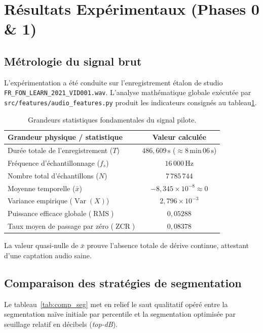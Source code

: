 \documentclass[10pt,a4paper,twocolumn]{article}
\begin{document}
\section{Résultats Expérimentaux (Phases 0 \& 1)}

\subsection{Métrologie du signal brut}
L'expérimentation a été conduite sur l'enregistrement étalon de studio \texttt{FR\_FON\_LEARN\_2021\_VID001.wav}. L'analyse mathématique globale exécutée par \texttt{src/features/audio\_features.py} produit les indicateurs consignés au tableau\ref{tab:signal_stats}.

\begin{table}[h]
\centering
\caption{Grandeurs statistiques fondamentales du signal pilote.}
\label{tab:signal_stats}
\vspace{0.15cm}
\small
\begin{tabular}{lc}
\toprule
\textbf{Grandeur physique / statistique} & \textbf{Valeur calculée} \\
\midrule
Durée totale de l'enregistrement ($T$) & $486{,}609\,\text{s}$ ($\approx 8\,\text{min}\,06\,\text{s}$) \\
Fréquence d'échantillonnage ($f_s$) & $16\,000\,\text{Hz}$ \\
Nombre total d'échantillons ($N$) & $7\,785\,744$ \\
Moyenne temporelle ($\bar{x}$) & $-8{,}345 \times 10^{-8} \approx 0$ \\
Variance empirique ($\operatorname{Var}(X)$) & $2{,}796 \times 10^{-3}$ \\
Puissance efficace globale ($\operatorname{RMS}$) & $0{,}05288$ \\
Taux moyen de passage par zéro ($\operatorname{ZCR}$) & $0{,}08378$ \\
\bottomrule
\end{tabular}
\end{table}

La valeur quasi-nulle de $\bar{x}$ prouve l'absence totale de dérive continue, attestant d'une captation audio saine.

\subsection{Comparaison des stratégies de segmentation}
Le tableau~\ref{tab:comp_seg} met en relief le saut qualitatif opéré entre la segmentation naïve initiale par percentile et la segmentation optimisée par seuillage relatif en décibels (\textit{top-dB}).
\end{document}
